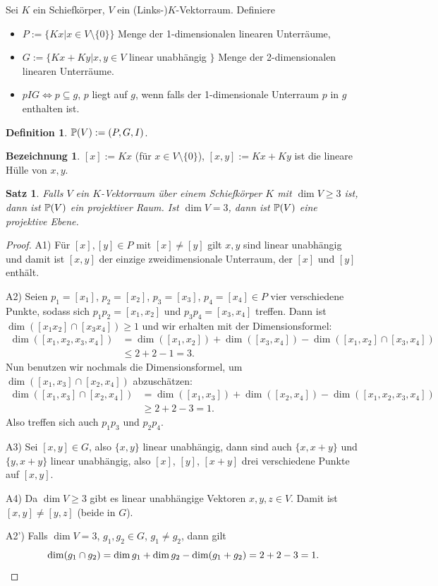 \documentclass[
 a4paper,
 12pt,
 parskip=half
 ]{scrartcl}
\theoremstyle{plain}
\newtheorem{thm}{Satz}[section] %
\theoremstyle{definition}
\newtheorem*{defn*}{Definition}
\newtheorem*{deno*}{Bezeichnung}
\begin{document}
Sei $K$ ein Schiefkörper, $V$ ein (Links-)$K$-Vektorraum. Definiere
\begin{itemize}
 \item $P := \{ Kx | x \in V \setminus \{ 0 \} \}$ Menge der 1-dimensionalen linearen Unterräume,
 \item $G := \{ Kx + Ky | x, y \in V $ linear unabhängig $\}$ Menge der 2-dimensionalen linearen Unterräume.
 \item $p I G \Leftrightarrow p \subseteq g$, $p$ liegt auf $g$, wenn falls der 1-dimensionale Unterraum $p$ in $g$ enthalten ist.
\end{itemize}

\begin{defn*}
 $\mathbb{P}(V) := (P,G,I)$.
\end{defn*}

\begin{deno*}
 $[x] := Kx$ (für $x \in V \setminus \{ 0 \}$), $[x,y] := Kx + Ky$ ist die lineare Hülle von $x,y$.
\end{deno*}

\begin{thm}
 Falls $V$ ein $K$-Vektorraum über einem Schiefkörper $K$ mit $\dim V \ge 3$ ist, dann ist $\mathbb{P}(V)$ ein projektiver Raum. Ist $\dim V = 3$, dann ist $\mathbb{P}(V)$ eine projektive Ebene.
\end{thm}

\begin{proof}
 A1) Für $[x], [y] \in P$ mit $[x] \ne [y]$ gilt $x,y$ sind linear unabhängig und damit ist $[x,y]$ der einzige zweidimensionale Unterraum, der $[x]$ und $[y]$ enthält.
 
 A2) Seien $p_1 = [x_1]$, $p_2 = [x_2]$, $p_3 = [x_3]$, $p_4 = [x_4] \in P$ vier verschiedene Punkte, sodass sich $p_1 p_2 = [x_1, x_2]$ und $p_3 p_4 = [x_3, x_4]$ treffen. Dann ist $\dim ( [x_1 x_2] \cap [x_3 x_4] ) \ge 1$ und wir erhalten mit der Dimensionsformel:
 \begin{align*}
  \dim( [x_1, x_2, x_3, x_4]) &= \dim( [x_1, x_2] ) + \dim( [x_3, x_4] ) - \dim( [x_1,x_2] \cap [x_3,x_4] ) \\
  &\le 2+2-1 = 3.
 \end{align*}
 Nun benutzen wir nochmals die Dimensionsformel, um $\dim( [x_1,x_3] \cap [x_2,x_4] )$ abzuschätzen:
 \begin{align*}
  \dim( [x_1,x_3] \cap [x_2,x_4] ) &= \dim( [x_1, x_3] ) + \dim( [x_2, x_4] ) - \dim( [x_1, x_2, x_3, x_4]) \\
  &\ge 2 + 2 - 3 = 1.
 \end{align*}
 Also treffen sich auch $p_1 p_3$ und $p_2 p_4$.
 
 A3) Sei $[x,y] \in G$, also $\{ x,y \}$ linear unabhängig, dann sind auch $\{ x, x+y \}$ und $\{ y, x+y \}$ linear unabhängig, also $[x]$, $[y]$, $[x+y]$ drei verschiedene Punkte auf $[x,y]$.
 
 A4) Da $\dim V \ge 3$ gibt es linear unabhängige Vektoren $x,y,z \in V$. Damit ist $[x,y] \ne [y,z]$ (beide in $G$).
 
 A2') Falls $\dim V = 3$, $g_1, g_2 \in G$, $g_1 \ne g_2$, dann gilt 
 \[ \dim( g_1 \cap g_2 ) = \dim g_1 + \dim g_2 - \dim( g_1 + g_2 ) = 2 + 2 - 3 = 1. \qedhere \]
\end{proof}
\end{document}
